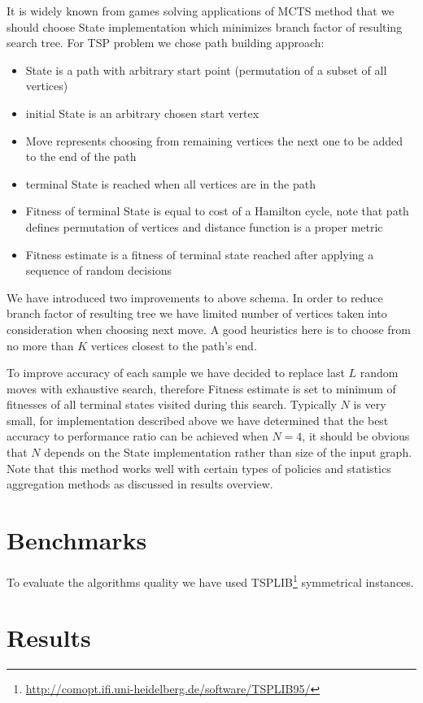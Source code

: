 It is widely known from games solving applications of MCTS method that we
should choose State implementation which minimizes branch factor of resulting
search tree. For TSP problem we chose path building approach:
\begin{itemize}
  \item State is a path with arbitrary start point (permutation of a subset of
    all vertices)
  \item initial State is an arbitrary chosen start vertex
  \item Move represents choosing from remaining vertices the next one to be
    added to the end of the path
  \item terminal State is reached when all vertices are in the path
  \item Fitness of terminal State is equal to cost of a Hamilton cycle, note
    that path defines permutation of vertices and distance function is a proper
    metric
  \item Fitness estimate is a fitness of terminal state reached after applying
    a sequence of random decisions
\end{itemize}

We have introduced two improvements to above schema. In order to reduce branch
factor of resulting tree we have limited number of vertices taken into
consideration when choosing next move. A good heuristics here is to choose from
no more than $K$ vertices closest to the path's end.

To improve accuracy of each sample we have decided to replace last $L$ random
moves with exhaustive search, therefore Fitness estimate is set to minimum of
fitnesses of all terminal states visited during this search. Typically $N$ is
very small, for implementation described above we have determined that the best
accuracy to performance ratio can be achieved when $N = 4$, it should be
obvious that $N$ depends on the State implementation rather than size of the
input graph. Note that this method works well with certain types of policies
and statistics aggregation methods as discussed in results overview.

\section{Benchmarks}
To evaluate the algorithms quality we have used
TSPLIB\footnote{\url{http://comopt.ifi.uni-heidelberg.de/software/TSPLIB95/}}
symmetrical instances.

\section{Results}

